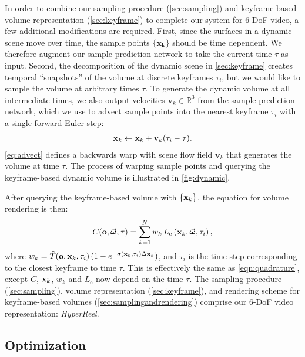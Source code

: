 \documentclass[10pt,twocolumn,letterpaper]{article}
\begin{document}
In order to combine our sampling procedure (\cref{sec:sampling}) and  keyframe-based volume representation (\cref{sec:keyframe}) to complete our system for 6-DoF video, a few additional modifications are required.
First, since the surfaces in a dynamic scene move over time, the sample points $\{\mathbf{x_k}\}$ should be time dependent. We therefore augment our sample prediction network to take the current time $\tau$ as input.
Second, the  decomposition of the dynamic scene in \cref{sec:keyframe} creates temporal ``snapshots'' of the volume at discrete keyframes $\tau_i$, but we would like to sample the volume at arbitrary times $\tau$. 
To generate the dynamic volume at all intermediate times, we also output velocities $\mathbf{v}_k \in \mathbb{R}^3$ from the sample prediction network, which we use to advect sample points into the nearest keyframe $\tau_i$ with a single forward-Euler step:
\begin{align}
    \mathbf{x}_k \leftarrow \mathbf{x}_k + \mathbf{v}_k(\tau_i - \tau) \text{.}
    \label{eq:advect}
\end{align}
\noindent \cref{eq:advect} defines a backwards warp with scene flow field $\mathbf{v}_k$ that generates the volume at time $\tau$. The process of warping sample points and querying the keyframe-based dynamic volume is illustrated in \cref{fig:dynamic}.

After querying the keyframe-based volume with $\{\mathbf{x}_k\}$, the equation for volume rendering is then:
\begin{align}
    C(\mathbf{o}, \vec{\boldsymbol{\omega}}, \tau) = \sum_{k = 1}^{N} w_k \,
    L_\text{e}\left(\mathbf{x}_k, \vec{\boldsymbol{\omega}}, \tau_i\right) \text{,}
\label{eqn:quadrature2}
\end{align}
where $w_k = \hat{T}\!\left(\mathbf{o}, \mathbf{x}_k, \tau_i\right) (1 - e^{-\sigma(\mathbf{x}_k, \tau_i) \Delta\mathbf{x}_k})$, and $\tau_i$ is the time step corresponding to the closest keyframe to time $\tau$.
This is effectively the same as \cref{eqn:quadrature}, except $C$, $\mathbf{x}_k$, $w_k$ and $L_\text{e}$ now depend on the time $\tau$.
The sampling procedure (\cref{sec:sampling}), volume representation (\cref{sec:keyframe}), and rendering scheme for keyframe-based volumes (\cref{sec:samplingandrendering}) comprise our 6-DoF video representation: \emph{HyperReel}.


\subsection{Optimization}
\label{sec:optimization}
\end{document}
